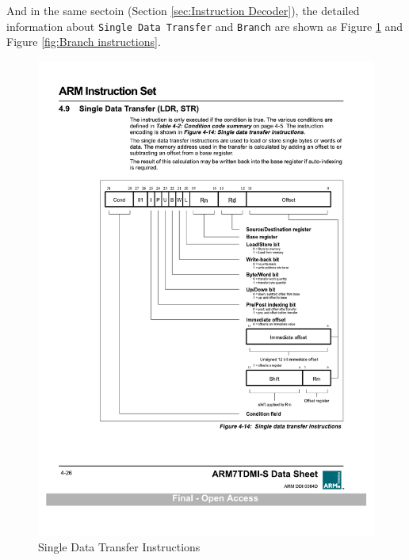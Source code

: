 \documentclass[12pt,a4paper]{article}
\begin{document}
And in the same sectoin (Section \ref{sec:Instruction Decoder}), the detailed information about \texttt{Single Data Transfer} and \texttt{Branch}
are shown as Figure \ref{fig:Single data transfer instructions} and Figure \ref{fig:Branch instructions}.

\begin{figure}[htp]
  \centering
  \includegraphics[width=1\textwidth]{picture/Single data transfer instructions.pdf}
  \caption{Single Data Transfer Instructions}     
  \label{fig:Single data transfer instructions}
\end{figure}
\end{document}

